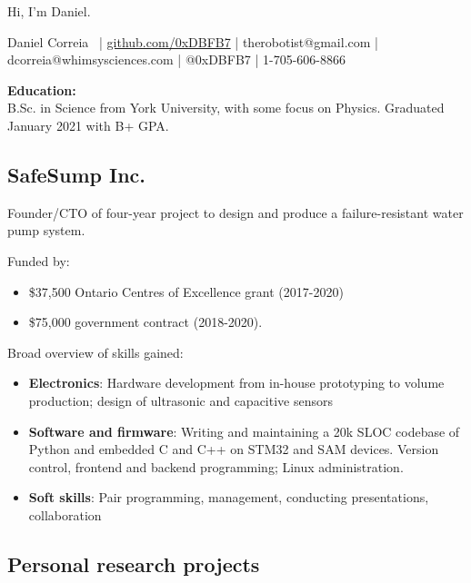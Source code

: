 \documentclass[fleqn,11pt]{article}
\begin{document}
\begingroup
{}\selectfont

{\Huge Hi, I'm Daniel.}

\endgroup


\small{{Daniel Correia}\  | \href{https://github.com/0xDBFB7}{github.com/0xDBFB7} | therobotist@gmail.com | dcorreia@whimsysciences.com | @0xDBFB7 | 1-705-606-8866\\
\light{\makebox[\linewidth]{\rule{\textwidth}{0.4pt}}}


\begin{multicols}{1}

\begin{tcolorbox}
\textbf{Education:\\}
B.Sc. in Science from York University, with some focus on Physics. Graduated January 2021 with B+ GPA.
\end{tcolorbox}

\subsection*{SafeSump Inc.}

Founder/CTO of four-year project to design and produce a failure-resistant water pump system. 

Funded by:
%
\begin{itemize}
\item \$37,500 Ontario Centres of Excellence grant (2017-2020)
\item \$75,000 government contract (2018-2020).
\end{itemize}
Broad overview of skills gained:

\begin{itemize}
	\item \textbf{Electronics}: Hardware development from in-house prototyping to volume production; design of ultrasonic and capacitive sensors
	\item \textbf{Software and firmware}: Writing and maintaining a 20k SLOC codebase of Python and embedded C and C++ on STM32 and SAM devices. Version control, frontend and backend programming; Linux administration.
	\item \textbf{Soft skills}: Pair programming, management, conducting presentations, collaboration
\end{itemize}

\subsection{Personal research projects}


\end{multicols}}
\end{document}
